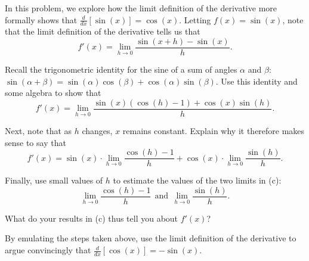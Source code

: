 \begin{activity} \label{A:2.4.Act9}  
In this problem, we explore how the limit definition of the derivative more formally shows that $\frac{d}{dx}[\sin(x)] = \cos(x)$.   Letting $f(x) = \sin(x)$, note that the limit definition of the derivative tells us that
	$$f'(x) = \lim_{h \to 0} \frac{\sin(x+h) - \sin(x)}{h}.$$
\ba
	\item Recall the trigonometric identity for the sine of a sum of angles $\alpha$ and $\beta$: $\sin(\alpha + \beta) = \sin(\alpha)\cos(\beta) + \cos(\alpha)\sin(\beta)$.  Use this identity and some algebra to show that
	$$f'(x) = \lim_{h \to 0} \frac{\sin(x)(\cos(h)-1) + \cos(x)\sin(h)}{h}.$$
	\item Next, note that as $h$ changes, $x$ remains constant. Explain why it therefore makes sense to say that
	$$f'(x) = \sin(x) \cdot \lim_{h \to 0} \frac{\cos(h) -1 }{h} + \cos(x) \cdot \lim_{h \to 0} \frac{\sin(h)}{h}.$$
	\item Finally, use small values of $h$ to estimate the values of the two limits in (c):
	$$\lim_{h \to 0} \frac{\cos(h) - 1}{h} \ \ \mbox{and} \ \ \lim_{h \to 0} \frac{\sin(h)}{h}.$$
	\item What do your results in (c) thus tell you about $f'(x)$?
	\item By emulating the steps taken above, use the limit definition of the derivative to argue convincingly that $\frac{d}{dx}[\cos(x)] = -\sin(x).$
\ea 

\end{activity}
